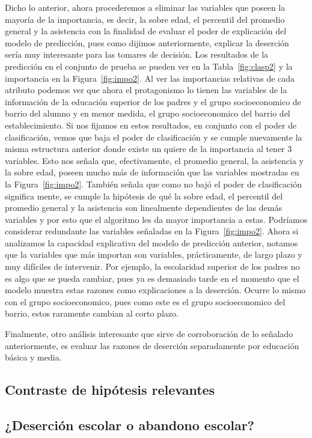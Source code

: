 Dicho lo anterior, ahora procederemos a eliminar las variables que poseen la mayoría de la importancia, es decir, la sobre edad, el percentil del promedio general y la asistencia con la finalidad de evaluar el poder de explicación del modelo de predicción, pues como dijimos anteriormente, explicar la deserción sería muy interesante para las tomares de decisión. Los resultados de la predicción en el conjunto de prueba se pueden ver en la Tabla~\ref{fig:clasp2} y la importancia en la Figura~\ref{fig:impo2}. Al ver las importancias relativas de cada atributo podemos ver que ahora el protagonismo lo tienen las variables de la información de la educación superior de los padres y el grupo socioeconomico de barrio del alumno y en menor medida, el grupo socioeconomico del barrio del establecimiento. Si nos fijamos en estos resultados, en conjunto con el poder de clasificación, vemos que baja el poder de clasificación y se cumple nuevamente la misma estructura anterior donde existe un quiere de la importancia al tener 3 variables. Esto nos señala que, efectivamente, el promedio general, la asistencia y la sobre edad, poseen mucho más de información que las variables mostradas en la Figura~\ref{fig:impo2}. También señala que como no bajó el poder de clasificación significa mente, se cumple la hipótesis de qué la sobre edad, el percentil del promedio general y la asistencia son linealmente dependientes de las demás variables y por esto que el algoritmo les da mayor importancia a estas. Podríamos considerar redundante las variables señaladas en la Figura~\ref{fig:impo2}.
Ahora si analizamos la capacidad explicativa del modelo de predicción anterior, notamos que la variables que más importan son variables, prácticamente, de largo plazo y muy difíciles de intervenir. Por ejemplo, la escolaridad superior de los padres no es algo que se pueda cambiar, pues ya es demasiado tarde en el momento que el modelo muestra estas razones como explicaciones a la deserción. Ocurre lo mismo con el grupo socioeconomico, pues como este es el grupo socioeconomico del barrio, estos raramente cambian al corto plazo.

Finalmente, otro análisis interesante que sirve de corroboración de lo señalado anteriormente, es evaluar las razones de deserción separadamente por educación básica y media.

\subsection{Contraste de hipótesis relevantes}
\subsection{¿Deserción escolar o abandono escolar?}